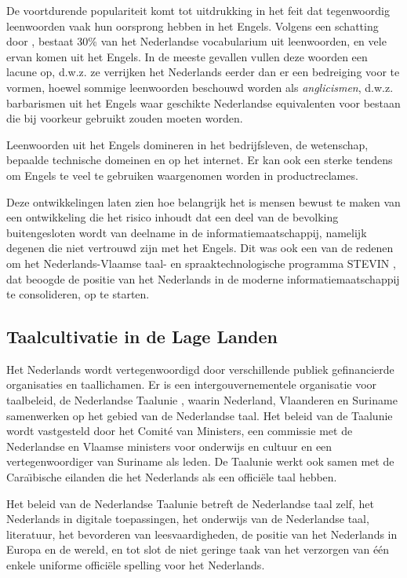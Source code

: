 \documentclass[]{../../metanetpaper}
\begin{document}
\begin{multicols}{2}
    De voortdurende populariteit komt tot uitdrukking in het feit dat tegenwoordig leenwoorden vaak hun oorsprong hebben in het Engels. Volgens een schatting door \cite{VanderSijs:2005}, bestaat 30\% van het Nederlandse vocabularium uit leenwoorden, en vele ervan komen uit het Engels. In de meeste gevallen vullen deze woorden een lacune op, d.w.z. ze verrijken het Nederlands eerder dan er een bedreiging voor te vormen, hoewel sommige leenwoorden beschouwd worden als \emph{anglicismen}, d.w.z. barbarismen uit het Engels waar geschikte Nederlandse equivalenten voor bestaan die bij voorkeur gebruikt zouden moeten worden.

    Leenwoorden uit het Engels domineren in het bedrijfsleven, de wetenschap, bepaalde technische domeinen en op het internet. Er kan ook een sterke tendens om Engels te veel te gebruiken waargenomen worden in productreclames.

    Deze ontwikkelingen laten zien hoe belangrijk het is mensen bewust te maken van een ontwikkeling die het risico inhoudt dat een deel van de bevolking buitengesloten wordt van deelname in de informatiemaatschappij, namelijk degenen die niet vertrouwd zijn met het Engels. Dit was ook een van de redenen om het Nederlands-Vlaamse taal- en spraaktechnologische programma STEVIN \cite{STEVIN}, dat beoogde de positie van het Nederlands in de moderne informatiemaatschappij te consolideren, op te starten.

\subsection{Taalcultivatie in de Lage Landen}

   Het Nederlands wordt vertegenwoordigd door verschillende publiek gefinancierde organisaties en taallichamen. Er is een intergouvernementele organisatie voor taalbeleid, de Nederlandse Taalunie \cite{NTU}, waarin Nederland, Vlaanderen en Suriname samenwerken op het gebied van de Nederlandse taal. Het beleid van de Taalunie wordt vastgesteld door het Comit{\'e} van Ministers, een commissie met de Nederlandse en Vlaamse ministers voor onderwijs en cultuur en een vertegenwoordiger van Suriname als leden. De Taalunie werkt ook samen met de Cara{\"\i}bische eilanden die het Nederlands als een offici{\"e}le taal hebben.

   Het beleid van de Nederlandse Taalunie betreft de Nederlandse taal zelf, het Nederlands in digitale toepassingen, het onderwijs van de Nederlandse taal, literatuur, het bevorderen van leesvaardigheden, de positie van het Nederlands in Europa en de wereld, en tot slot de niet geringe taak van het verzorgen van {\'e}{\'e}n enkele uniforme offici{\"e}le spelling voor het Nederlands.


\end{multicols}
\end{document}
